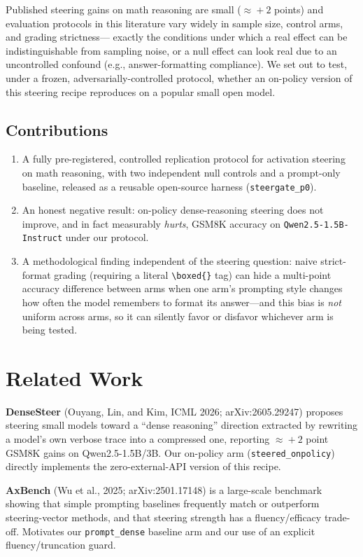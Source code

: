\documentclass[11pt]{article}
\begin{document}
Published steering gains on math reasoning are small ($\approx\!+2$ points) and evaluation
protocols in this literature vary widely in sample size, control arms, and grading strictness---
exactly the conditions under which a real effect can be indistinguishable from sampling noise, or
a null effect can look real due to an uncontrolled confound (e.g., answer-formatting compliance).
We set out to test, under a frozen, adversarially-controlled protocol, whether an on-policy
version of this steering recipe reproduces on a popular small open model.

\subsection*{Contributions}
\begin{enumerate}
  \item A fully pre-registered, controlled replication protocol for activation steering on math
    reasoning, with two independent null controls and a prompt-only baseline, released as a
    reusable open-source harness (\texttt{steergate\_p0}).
  \item An honest negative result: on-policy dense-reasoning steering does not improve, and in
    fact measurably \emph{hurts}, GSM8K accuracy on \texttt{Qwen2.5-1.5B-Instruct} under our
    protocol.
  \item A methodological finding independent of the steering question: naive strict-format
    grading (requiring a literal \texttt{\textbackslash boxed\{\}} tag) can hide a multi-point
    accuracy difference between arms when one arm's prompting style changes how often the model
    remembers to format its answer---and this bias is \emph{not} uniform across arms, so it can
    silently favor or disfavor whichever arm is being tested.
\end{enumerate}

\section{Related Work}

\textbf{DenseSteer} (Ouyang, Lin, and Kim, ICML 2026; arXiv:2605.29247) proposes steering small
models toward a ``dense reasoning'' direction extracted by rewriting a model's own verbose trace
into a compressed one, reporting $\approx\!+2$ point GSM8K gains on Qwen2.5-1.5B/3B. Our
on-policy arm (\texttt{steered\_onpolicy}) directly implements the zero-external-API version of
this recipe.

\textbf{AxBench} (Wu et al., 2025; arXiv:2501.17148) is a large-scale benchmark showing that
simple prompting baselines frequently match or outperform steering-vector methods, and that
steering strength has a fluency/efficacy trade-off. Motivates our \texttt{prompt\_dense} baseline
arm and our use of an explicit fluency/truncation guard.
\end{document}
